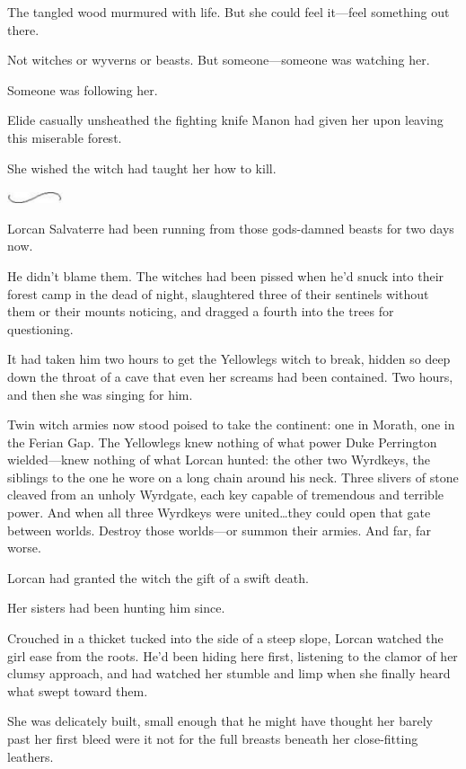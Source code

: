 The tangled wood murmured with life.
But she could feel it---feel something out there.

Not witches or wyverns or beasts.
But someone---someone was watching her.

Someone was following her.

Elide casually unsheathed the fighting knife Manon had given her upon leaving this miserable forest.

She wished the witch had taught her how to kill.

\begin{center}
    \includegraphics[width=0.65in,height=0.13in]{images/seperator}
\end{center}

Lorcan Salvaterre had been running from those gods-damned beasts for two days now.

He didn't blame them.
The witches had been pissed when he'd snuck into their forest camp in the dead of night, slaughtered three of their sentinels without them or their mounts noticing, and dragged a fourth into the trees for questioning.

It had taken him two hours to get the Yellowlegs witch to break, hidden so deep down the throat of a cave that even her screams had been contained.
Two hours, and then she was singing for him.

Twin witch armies now stood poised to take the continent: one in Morath, one in the Ferian Gap.
The Yellowlegs knew nothing of what power Duke Perrington wielded---knew nothing of what Lorcan hunted: the other two Wyrdkeys, the siblings to the one he wore on a long chain around his neck.
Three slivers of stone cleaved from an unholy Wyrdgate, each key capable of tremendous and terrible power.
And when all three Wyrdkeys were united\ldots they could open that gate between worlds.
Destroy those worlds---or summon their armies.
And far, far worse.

Lorcan had granted the witch the gift of a swift death.

Her sisters had been hunting him since.

Crouched in a thicket tucked into the side of a steep slope, Lorcan watched the girl ease from the roots.
He'd been hiding here first, listening to the clamor of her clumsy approach, and had watched her stumble and limp when she finally heard what swept toward them.

She was delicately built, small enough that he might have thought her barely past her first bleed were it not for the full breasts beneath her close-fitting leathers.

